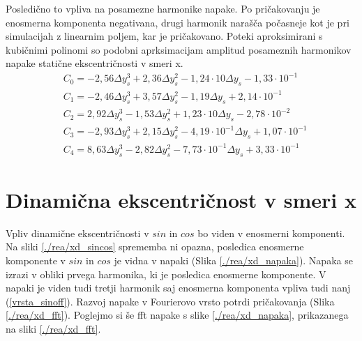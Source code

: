 Posledično to vpliva na posamezne harmonike napake. Po pričakovanju je enosmerna komponenta negativana, drugi harmonik narašča počasneje kot je pri simulacijah z linearnim poljem, kar je pričakovano. Poteki aproksimirani s kubičnimi polinomi so podobni aprksimacijam amplitud posameznih harmonikov napake statične ekscentričnosti v smeri x.
\begin{eqnarray}
&C_0 =-2,56\Delta y_s^{3}+2,36\Delta y_s^{2}-1,24\cdot 10\Delta y_s-1,33\cdot 10^{-1} \\     
&C_1 =-2,46\Delta y_s^{3}+3,57\Delta y_s^{2}-1,19\Delta y_s+2,14\cdot 10^{-1} \\             
&C_2 =2,92\Delta y_s^{3}-1,53\Delta y_s^{2}+1,23\cdot 10\Delta y_s-2,78\cdot 10^{-2} \\      
&C_3 =-2,93\Delta y_s^{3}+2,15\Delta y_s^{2}-4,19\cdot 10^{-1}\Delta y_s+1,07\cdot 10^{-1} \\
&C_4 =8,63\Delta y_s^{3}-2,82\Delta y_s^{2}-7,73\cdot 10^{-1}\Delta y_s+3,33\cdot 10^{-1}          
\end{eqnarray}
\section{Dinamična ekscentričnost v smeri x}
Vpliv dinamične ekscentričnosti v $sin$ in $cos$ bo viden v enosmerni komponenti. Na sliki  \ref{./rea/xd_sincos} sprememba ni opazna, posledica enosmerne komponente v $sin$ in $cos$  je vidna v napaki (Slika \ref{./rea/xd_napaka}). Napaka se izrazi v obliki prvega harmonika, ki je posledica enosmerne komponente. V napaki je viden tudi tretji harmonik saj enosmerna komponenta vpliva tudi nanj (\ref{vrsta_sinoff}). Razvoj napake v Fourierovo vrsto potrdi pričakovanja (Slika \ref{./rea/xd_fft}). Poglejmo si še fft napake s slike \ref{./rea/xd_napaka}, prikazanega na sliki \ref{./rea/xd_fft}.
\newpage
